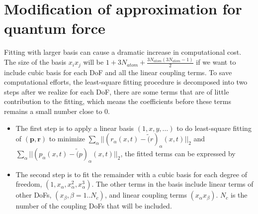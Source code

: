\documentclass[11pt]{revtex4}
\begin{document}
%
%

\section{Modification of approximation for quantum force}
Fitting with larger basis can cause a dramatic  increase in computational cost. The size of the basis $x_ix_j$ will be $1+3N_{atom}+\frac{3N_{atom}(3N_{atom}-1)}{2}$ if we want to include cubic basis for each DoF and all the linear coupling terms. To save computational efforts, the least-square fitting procedure is decomposed into two steps after we realize for each DoF, there are some terms that are of little contribution to the fitting, which means the coefficients before these terms remains a small number close to 0.

 \begin{itemize}
 \item The first step is to apply a linear basis $(1,x,y,\dots)$ to do least-square fitting of $(\bm p, \bm r)$ to minimize $\sum_\alpha || (r_\alpha(x,t) - \tilde(r)_\alpha(x,t) ||_2$ and $\sum_\alpha || (p_\alpha(x,t) - \tilde(p)_\alpha(x,t) ||_2$,  the fitted terms can be expressed by

 \item The second step is to fit the remainder with a cubic basis for each degree of freedom, $(1,x_\alpha,x_\alpha^2,x_\alpha^3)$. The other terms in the basis include linear terms of other DoFs, $(x_\beta, \beta = 1..N_c)$, and linear coupling terms $(x_\alpha x_\beta)$. $N_c$ is the number of the coupling DoFs that will be included. 
 \end{itemize}
\end{document}
